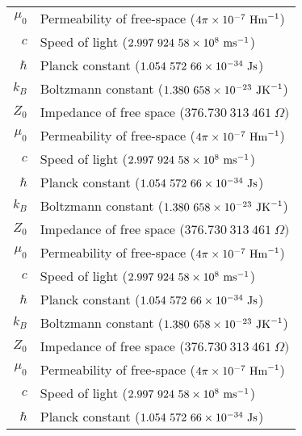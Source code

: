 \begin{longtable}{rl}
    $\mu_0$ & Permeability of free-space ($4\pi\times 10^{-7}\ \mbox{Hm}^{-1}$)  \\
    $c$     & Speed of light ($2.997\ 924\ 58 \times 10^{8}\ \mbox{ms}^{-1}$)    \\
    $\hbar$ & Planck constant ($1.054\ 572\ 66\times 10^{-34}\ \mbox{Js}$)       \\
    $k_B$   & Boltzmann constant  ($1.380\ 658\times 10^{-23}\ \mbox{JK}^{-1} $) \\
    $Z_0$   & Impedance of free space  ($376.730\ 313\ 461\ \Omega) $    \\
    $\mu_0$ & Permeability of free-space ($4\pi\times 10^{-7}\ \mbox{Hm}^{-1}$)  \\
    $c$     & Speed of light ($2.997\ 924\ 58 \times 10^{8}\ \mbox{ms}^{-1}$)    \\
    $\hbar$ & Planck constant ($1.054\ 572\ 66\times 10^{-34}\ \mbox{Js}$)       \\
    $k_B$   & Boltzmann constant  ($1.380\ 658\times 10^{-23}\ \mbox{JK}^{-1} $) \\
    $Z_0$   & Impedance of free space  ($376.730\ 313\ 461\ \Omega) $    \\
    $\mu_0$ & Permeability of free-space ($4\pi\times 10^{-7}\ \mbox{Hm}^{-1}$)  \\
    $c$     & Speed of light ($2.997\ 924\ 58 \times 10^{8}\ \mbox{ms}^{-1}$)    \\
    $\hbar$ & Planck constant ($1.054\ 572\ 66\times 10^{-34}\ \mbox{Js}$)       \\
    $k_B$   & Boltzmann constant  ($1.380\ 658\times 10^{-23}\ \mbox{JK}^{-1} $) \\
    $Z_0$   & Impedance of free space  ($376.730\ 313\ 461\ \Omega) $    \\
    $\mu_0$ & Permeability of free-space ($4\pi\times 10^{-7}\ \mbox{Hm}^{-1}$)  \\
    $c$     & Speed of light ($2.997\ 924\ 58 \times 10^{8}\ \mbox{ms}^{-1}$)    \\
    $\hbar$ & Planck constant ($1.054\ 572\ 66\times 10^{-34}\ \mbox{Js}$)
\end{longtable}

